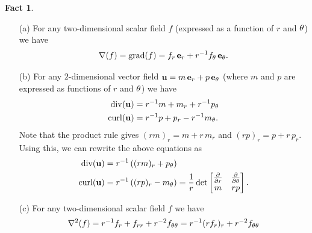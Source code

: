 \documentclass[reqno]{amsart}
\theoremstyle{definition}
\newtheorem{fact}[theorem]{Fact}
\begin{document}
\begin{fact}\label{fact-polar-fields-two}
 \begin{itemize}
  \item[(a)] For any two-dimensional scalar field $f$ (expressed as a
   function of $r$ and $\theta$) we have 
   \[ \nabla(f) = \operatorname{grad}(f) = f_r\,\mathbf{e}_r + r^{-1}f_\theta\,\mathbf{e}_\theta. \]
  \item[(b)] For any $2$-dimensional vector field
   $\mathbf{u}=m\,\mathbf{e}_r+p\,\mathbf{e}_\theta$ (where $m$ and $p$ are expressed as
   functions of $r$ and $\theta$) we have 
   \begin{align*}
    \operatorname{div}(\mathbf{u}) &= r^{-1}m + m_r + r^{-1}p_\theta \\
    \operatorname{curl}(\mathbf{u}) &= r^{-1}p + p_r - r^{-1}m_\theta.
   \end{align*}
   Note that the product rule gives $(rm)_r=m+r\,m_r$ and
   $(rp)_r=p+r\,p_r$.  Using this, we can rewrite the above equations
   as 
   \begin{align*}
    \operatorname{div}(\mathbf{u}) &= r^{-1}\left((rm)_r + p_\theta \right) \\
    \operatorname{curl}(\mathbf{u}) &= r^{-1}\left((rp)_r - m_\theta \right) 
      = \frac{1}{r} \det\left[\begin{matrix} \frac{\partial}{\partial r} & \frac{\partial}{\partial\theta} \\ m & rp \end{matrix}\right].
   \end{align*}
  \item[(c)] For any two-dimensional scalar field $f$ we have 
   \[ \nabla^2(f) = r^{-1}f_r + f_{rr} + r^{-2}f_{\theta\theta} 
        = r^{-1}(rf_r)_r + r^{-2}f_{\theta\theta} 
   \]
 \end{itemize}
\end{fact}
\end{document}
